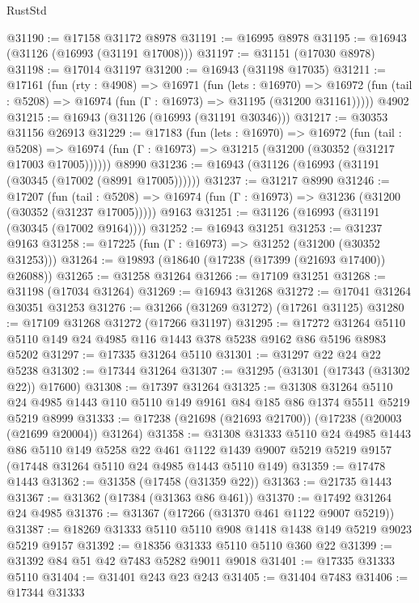 \begin{lexlean}{RustStd}
\begin{coremodule}
@31190 := @17158 @31172 @8978
@31191 := @16995 @8978
@31195 := @16943 (@31126 (@16993 (@31191 @17008)))
@31197 := @31151 (@17030 @8978)
@31198 := @17014 @31197
@31200 := @16943 (@31198 @17035)
@31211 := @17161
    (fun (rty : @4908) =>
    @16971
      (fun (lets : @16970) =>
      @16972 (fun (tail : @5208) => @16974 (fun (Γ : @16973) => @31195 (@31200 @31161)))))
    @4902
@31215 := @16943 (@31126 (@16993 (@31191 @30346)))
@31217 := @30353 @31156 @26913
@31229 := @17183
    (fun (lets : @16970) =>
    @16972
      (fun (tail : @5208) =>
      @16974 (fun (Γ : @16973) => @31215 (@31200 (@30352 (@31217 @17003 @17005))))))
    @8990
@31236 := @16943 (@31126 (@16993 (@31191 (@30345 (@17002 (@8991 @17005))))))
@31237 := @31217 @8990
@31246 := @17207
    (fun (tail : @5208) => @16974 (fun (Γ : @16973) => @31236 (@31200 (@30352 (@31237 @17005)))))
    @9163
@31251 := @31126 (@16993 (@31191 (@30345 (@17002 @9164))))
@31252 := @16943 @31251
@31253 := @31237 @9163
@31258 := @17225 (fun (Γ : @16973) => @31252 (@31200 (@30352 @31253)))
@31264 := @19893 (@18640 (@17238 (@17399 (@21693 @17400)) @26088))
@31265 := @31258 @31264
@31266 := @17109 @31251
@31268 := @31198 (@17034 @31264)
@31269 := @16943 @31268
@31272 := @17041 @31264 @30351 @31253
@31276 := @31266 (@31269 @31272) (@17261 @31125)
@31280 := @17109 @31268 @31272 (@17266 @31197)
@31295 := @17272 @31264 @5110 @5110 @149 @24 @4985 @116 @1443 @378 @5238 @9162 @86 @5196 @8983 @5202
@31297 := @17335 @31264 @5110
@31301 := @31297 @22 @24 @22 @5238
@31302 := @17344 @31264
@31307 := @31295 (@31301 (@17343 (@31302 @22)) @17600)
@31308 := @17397 @31264
@31325 := @31308
    @31264
    @5110
    @24
    @4985
    @1443
    @110
    @5110
    @149
    @9161
    @84
    @185
    @86
    @1374
    @5511
    @5219
    @5219
    @8999
@31333 := @17238 (@21698 (@21693 @21700)) (@17238 (@20003 (@21699 @20004)) @31264)
@31358 := @31308
    @31333
    @5110
    @24
    @4985
    @1443
    @86
    @5110
    @149
    @5258
    @22
    @461
    @1122
    @1439
    @9007
    @5219
    @5219
    @9157
    (@17448 @31264 @5110 @24 @4985 @1443 @5110 @149)
@31359 := @17478 @1443
@31362 := @31358 (@17458 (@31359 @22))
@31363 := @21735 @1443
@31367 := @31362 (@17384 (@31363 @86 @461))
@31370 := @17492 @31264 @24 @4985
@31376 := @31367 (@17266 (@31370 @461 @1122 @9007 @5219))
@31387 := @18269 @31333 @5110 @5110 @908 @1418 @1438 @149 @5219 @9023 @5219 @9157
@31392 := @18356 @31333 @5110 @5110 @360 @22
@31399 := @31392 @84 @51 @42 @7483 @5282 @9011 @9018
@31401 := @17335 @31333 @5110
@31404 := @31401 @243 @23 @243
@31405 := @31404 @7483
@31406 := @17344 @31333

\end{coremodule}
\end{lexlean}

